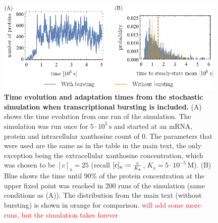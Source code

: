 \documentclass[10pt,letterpaper]{article}
\newcommand{\unit}[1]{\,\mathrm{#1}}
\newcommand{\n}[1]{\mathrm{#1}}
\newcommand*{\defeq}{\mathrel{\vcenter{\baselineskip0.5ex \lineskiplimit0pt
			\hbox{\scriptsize.}\hbox{\scriptsize.}}}%
	=}
\begin{document}
\begin{figure}
	\centering
	\includegraphics[width=1\textwidth]{FigSI6_7.pdf}
	\caption{{\bf Time evolution and adaptation times from the stochastic simulation when transcriptional bursting is included.}
		(A) shows the time evolution from one run of the simulation. The simulation was run once for $5 \cdot 10^5 \unit{s}$ and started
		at an mRNA, protein and intracellular xanthosine count of 0. The parameters that were used are the same as in the
		table in the main text, the only exception being the
		extracellular xanthosine concentration, which was chosen to be
		$\n{[c]_a} = 25$ (recall $\n{[c]_{a}} \defeq \frac{c}{K_{\n{a}}}$,
		$K_{\n{a}} = 5 \cdot 10^{-5} \unit{M}$). (B) Blue shows the time until 90\% of the protein concentration at the upper fixed point was reached in 200 runs of the simulation (same conditions as (A)). The distribution from the main text (without bursting) is shown in orange for comparison. \textcolor{red}{will add some more runs, but the simulation takes forever}}
	\label{evolbursts}
\end{figure}
\end{document}
